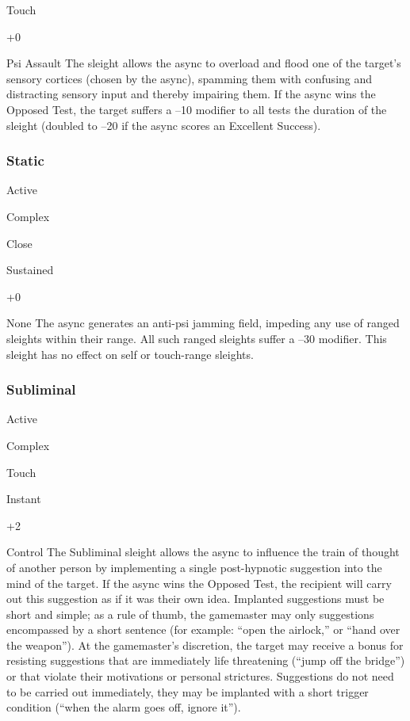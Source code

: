  Touch

  

   +0

  

Psi Assault
The sleight allows the async to overload and flood one 
of the target's sensory cortices (chosen by the async), 
spamming them with confusing and distracting sensory
input and thereby impairing them. If the async
wins the Opposed Test, the target suffers a –10 modifier
to all tests the duration of the sleight (doubled to
–20 if the async scores an Excellent Success).

\subsubsection{Static}


  

Active

   Complex

 Close

   Sustained

   +0

  

None
The async generates an anti-psi jamming field, impeding
any use of ranged sleights within their range. All
such ranged sleights suffer a –30 modifier. This sleight 
has no effect on self or touch-range sleights. 

\subsubsection{Subliminal}


  

Active

   Complex

 Touch

   Instant

   +2

  

Control
The Subliminal sleight allows the async to influence 
the train of thought of another person by implementing
a single post-hypnotic suggestion into the mind
of the target. If the async wins the Opposed Test, the 
recipient will carry out this suggestion as if it was 
their own idea. Implanted suggestions must be short 
and simple; as a rule of thumb, the gamemaster may 
only suggestions encompassed by a short sentence 
(for example: ``open the airlock,'' or ``hand over the 
weapon''). At the gamemaster's discretion, the target 
may receive a bonus for resisting suggestions that are 
immediately life threatening (``jump off the bridge'') 
or that violate their motivations or personal strictures. 
Suggestions do not need to be carried out immediately, 
they may be implanted with a short trigger condition 
(``when the alarm goes off, ignore it'').

